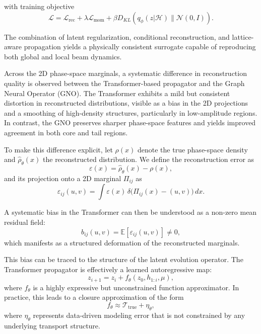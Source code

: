 \documentclass[11pt,a4paper]{article}
\begin{document}
\begin{sloppypar}
with training objective
\begin{equation}
\mathcal{L}
=
\mathcal{L}_{\mathrm{rec}}
+
\lambda \mathcal{L}_{\mathrm{mom}}
+
\beta D_{KL}(q_{\phi}(z|\mathcal{H}) \| \mathcal{N}(0,I)).
\end{equation}

The combination of latent regularization, conditional reconstruction, and lattice-aware propagation yields a physically consistent surrogate capable of reproducing both global and local beam dynamics.

Across the 2D phase-space marginals, a systematic difference in reconstruction quality is observed between the Transformer-based propagator and the Graph Neural Operator (GNO). The Transformer exhibits a mild but consistent distortion in reconstructed distributions, visible as a bias in the 2D projections and a smoothing of high-density structures, particularly in low-amplitude regions. In contrast, the GNO preserves sharper phase-space features and yields improved agreement in both core and tail regions.

To make this difference explicit, let $\rho(x)$ denote the true phase-space density and $\hat{\rho}_\theta(x)$ the reconstructed distribution. We define the reconstruction error as
\begin{equation}
\varepsilon(x) = \hat{\rho}_\theta(x) - \rho(x),
\end{equation}
and its projection onto a 2D marginal $\Pi_{ij}$ as
\begin{equation}
\varepsilon_{ij}(u,v)
=
\int \varepsilon(x)\, \delta\!\big(\Pi_{ij}(x) - (u,v)\big)\, dx.
\end{equation}

A systematic bias in the Transformer can then be understood as a non-zero mean residual field:
\begin{equation}
b_{ij}(u,v)
=
\mathbb{E}[\varepsilon_{ij}(u,v)] \neq 0,
\end{equation}
which manifests as a structured deformation of the reconstructed marginals.

This bias can be traced to the structure of the latent evolution operator. The Transformer propagator is effectively a learned autoregressive map:
\begin{equation}
z_{i+1} = z_i + f_\theta\!\left(z_0, h_{1:i}, \mu\right),
\end{equation}
where $f_\theta$ is a highly expressive but unconstrained function approximator. In practice, this leads to a closure approximation of the form
\begin{equation}
f_\theta \approx \mathcal{T}_{\text{true}} + \eta_\theta,
\end{equation}
where $\eta_\theta$ represents data-driven modeling error that is not constrained by any underlying transport structure.


\end{sloppypar}
\end{document}

